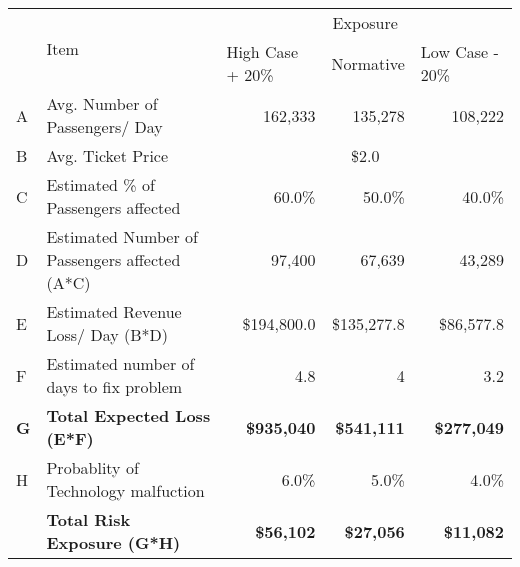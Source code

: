 \begin{table}[h]
\begin{tabularx}{\textwidth}{@{}lXrrr@{}}
\toprule
\multirow{2}{*}{} & \multirow{2}{*}{Item}                         & \multicolumn{3}{c}{Exposure}                                                                               \\ \cmidrule(l){3-5} 
                  &                                               & \multicolumn{1}{l}{High Case + 20\%} & \multicolumn{1}{l}{Normative} & \multicolumn{1}{l}{Low Case - 20\%} \\
            \midrule
A                 & Avg. Number of Passengers/ Day                & 162,333                              & 135,278                       & 108,222                             \\
B                 & Avg. Ticket Price                             & \multicolumn{3}{c}{\$2.0}                                                                                  \\
C                 & Estimated \% of Passengers affected           & 60.0\%                               & 50.0\%                        & 40.0\%                              \\
D                 & Estimated Number of Passengers affected (A*C) & 97,400                               & 67,639                        & 43,289                              \\
E                 & Estimated Revenue Loss/ Day (B*D)             & \$194,800.0                          & \$135,277.8                   & \$86,577.8                          \\
F                 & Estimated number of days to fix problem       & 4.8                                  & 4                             & 3.2                                 \\
\textbf{G}        & \textbf{Total Expected Loss (E*F)}            & \textbf{\$935,040}                   & \textbf{\$541,111}            & \textbf{\$277,049}                  \\
H                 & Probablity of Technology malfuction           & 6.0\%                                & 5.0\%                         & 4.0\%                               \\
\textbf{}         & \textbf{Total Risk Exposure (G*H)}            & \textbf{\$56,102}                    & \textbf{\$27,056}             & \textbf{\$11,082}       \\
\bottomrule           
\end{tabularx}
\end{table}